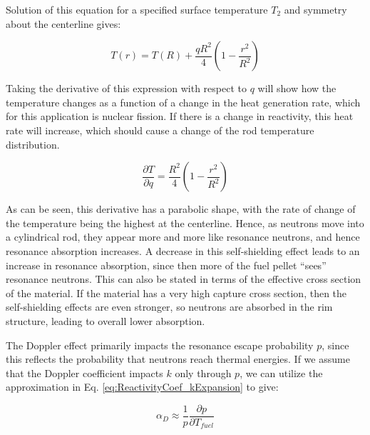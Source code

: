 \documentclass[10pt]{article}
\begin{document}
\begin{flushleft}
Solution of this equation for a specified surface temperature \(T_2\) and symmetry about the centerline gives:

\begin{equation}
\label{eq:ConductionHeatTransfer_GenSolution}
T(r) = T(R) + \frac{qR^2}{4}(1-\frac{r^2}{R^2})
\end{equation}

Taking the derivative of this expression with respect to \(q\) will show how the temperature changes as a function of a change in the heat generation rate, which for this application is nuclear fission. If there is a change in reactivity, this heat rate will increase, which should cause a change of the rod temperature distribution. 

\begin{equation}
\label{eq:ConductionHeatTransfer_Derivative}
\frac{\partial T}{\partial q} = \frac{R^2}{4}(1-\frac{r^2}{R^2})
\end{equation}

As can be seen, this derivative has a parabolic shape, with the rate of change of the temperature being the highest at the centerline. Hence, as neutrons move into a cylindrical rod, they appear more and more like resonance neutrons, and hence resonance absorption increases. A decrease in this self-shielding effect leads to an increase in resonance absorption, since then more of the fuel pellet ``sees'' resonance neutrons. This can also be stated in terms of the effective cross section of the material. If the material has a very high capture cross section, then the self-shielding effects are even stronger, so neutrons are absorbed in the rim structure, leading to overall lower absorption. 

The Doppler effect primarily impacts the resonance escape probability \(p\), since this reflects the probability that neutrons reach thermal energies. If we assume that the Doppler coefficient impacts \(k\) only through \(p\), we can utilize the approximation in Eq. \ref{eq:ReactivityCoef_kExpansion} to give:

\begin{equation}
\label{eq:DopplerCoefficient_pExpansion}
\alpha_D \approx \frac{1}{p}\frac{\partial p}{\partial T_{fuel}}
\end{equation}


\end{flushleft}
\end{document}
